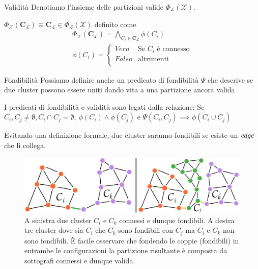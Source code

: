 \documentclass[usenames,dvipsnames,9pt]{beamer}
\theoremstyle{definition}
\begin{document}
\begin{frame}{Validità}
Denotiamo l'insieme delle partizioni valide $\Phi_\mathcal{L}(\mathcal{X})$.
\begin{definition}
$\Phi_\mathcal{X}(\textbf{C}_\mathcal{L}) \equiv \textbf{C}_\mathcal{L}\in \Phi_\mathcal{L}(\mathcal{X})$ definito come
\begin{equation*}
\begin{gathered}
\Phi_\mathcal{X}(\textbf{C}_\mathcal{L}) = \bigwedge_{C_i\in\textbf{C}_\mathcal{L}}\phi(C_i) \\
\phi(C_i) = 
  \begin{cases}
                                   Vero & \text{Se $C_i$ è connesso} \\
                                   Falso & \text{altrimenti} \\
  \end{cases}
\end{gathered}
\end{equation*}
\end{definition}
\end{frame}

\begin{frame}{Fondibilità}
Possiamo definire anche un predicato di fondibilità $\Psi$ che descrive se due cluster possono essere uniti dando vita a una partizione ancora valida
\begin{definition}
I predicati di fondibilità e validità sono legati dalla relazione:
Se $C_i,C_j\neq \emptyset, C_i\cap C_j =\emptyset, \ \phi(C_i)\wedge\phi(C_j)$ e $\Psi(C_i, C_j) \implies \phi(C_i\cup C_j)$
\end{definition}
Evitando una definizione formale, due cluster saranno fondibili se esiste un $\it{edge}$ che li collega.
\end{frame}

\begin{frame}
\begin{figure}[t]
\centering
\includegraphics[width=1\textwidth]{graphics/connectedclusters.png}
\caption{A sinistra due cluster $C_i$ e $C_k$ connessi e dunque fondibili. A destra tre cluster dove sia $C_i$ che $C_k$ sono fondibili con $C_j$ ma $C_i$ e $C_k$ non sono fondibili. È facile osservare che fondendo le coppie (fondibili) in entrambe le configurazioni la partizione risultante è composta da sottografi connessi e dunque valida.}
\end{figure}
\end{frame}
\end{document}
